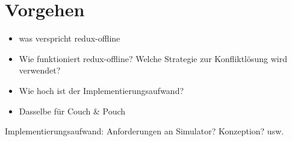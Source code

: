\chapter{\label{chap:implementierung}Vorgehen}
\begin{itemize}
  \item was verspricht redux-offline
  \item Wie funktioniert redux-offline? Welche Strategie zur Konfliktlösung wird verwendet?
  \item Wie hoch ist der Implementierungsaufwand?
  \item Dasselbe für Couch \& Pouch
\end{itemize}

Implementierungsaufwand: Anforderungen an Simulator? Konzeption? usw.
